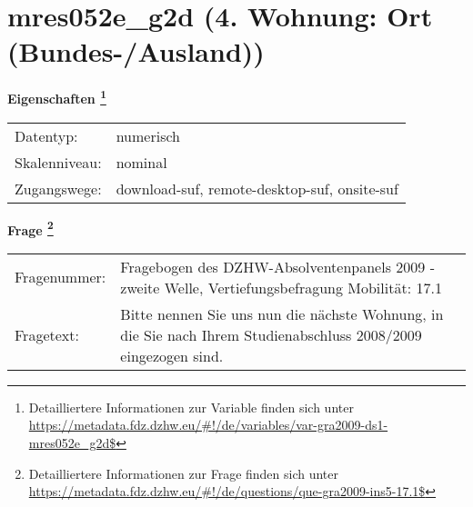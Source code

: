 
    \setcounter{footnote}{0}

    \vspace*{-1.8cm}
	\section{mres052e\_g2d (4. Wohnung: Ort (Bundes-/Ausland))}
	\label{section:mres052e_g2d}



    \vspace*{0.5cm}
    \noindent\textbf{Eigenschaften
	\footnote{Detailliertere Informationen zur Variable finden sich unter
		\url{https://metadata.fdz.dzhw.eu/\#!/de/variables/var-gra2009-ds1-mres052e_g2d$}}}\\
	\begin{tabularx}{\hsize}{@{}lX}
	Datentyp: & numerisch \\
	Skalenniveau: & nominal \\
	Zugangswege: &
	  download-suf, 
	  remote-desktop-suf, 
	  onsite-suf
 \\
    \end{tabularx}



				\vspace*{0.5cm}
                \noindent\textbf{Frage
	                \footnote{Detailliertere Informationen zur Frage finden sich unter
		              \url{https://metadata.fdz.dzhw.eu/\#!/de/questions/que-gra2009-ins5-17.1$}}}\\
				\begin{tabularx}{\hsize}{@{}lX}
					Fragenummer: &
					  Fragebogen des DZHW-Absolventenpanels 2009 - zweite Welle, Vertiefungsbefragung Mobilität:
					  17.1
 \\
					Fragetext: & Bitte nennen Sie uns nun die nächste Wohnung, in die Sie nach Ihrem Studienabschluss 2008/2009 eingezogen sind. \\
				\end{tabularx}





